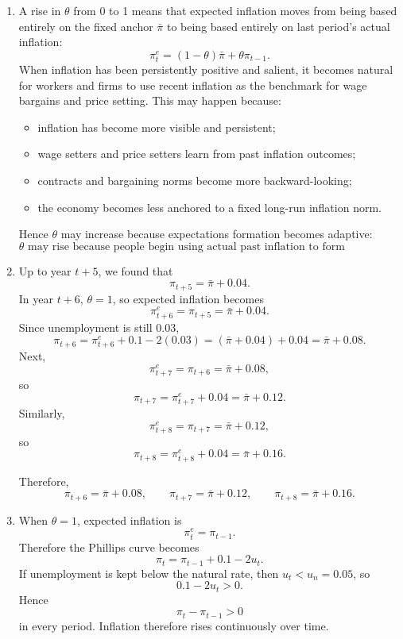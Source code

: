 \documentclass[12pt]{article}
\begin{document}
\begin{enumerate}[label=(\alph*)]
    \item
    A rise in \(\theta\) from 0 to 1 means that expected inflation moves from being based entirely on the fixed anchor \(\bar{\pi}\) to being based entirely on last period's actual inflation:
    \[
    \pi_t^e=(1-\theta)\bar{\pi}+\theta\pi_{t-1}.
    \]
    When inflation has been persistently positive and salient, it becomes natural for workers and firms to use recent inflation as the benchmark for wage bargains and price setting. This may happen because:
    \begin{itemize}[leftmargin=*]
        \item inflation has become more visible and persistent;
        \item wage setters and price setters learn from past inflation outcomes;
        \item contracts and bargaining norms become more backward-looking;
        \item the economy becomes less anchored to a fixed long-run inflation norm.
    \end{itemize}
    Hence \(\theta\) may increase because expectations formation becomes adaptive:
    \[
    \boxed{\theta \text{ may rise because people begin using actual past inflation to form expectations.}}
    \]

    \item
    Up to year \(t+5\), we found that
    \[
    \pi_{t+5}=\bar{\pi}+0.04.
    \]
    In year \(t+6\), \(\theta=1\), so expected inflation becomes
    \[
    \pi_{t+6}^e=\pi_{t+5}=\bar{\pi}+0.04.
    \]
    Since unemployment is still \(0.03\),
    \[
    \pi_{t+6}=\pi_{t+6}^e+0.1-2(0.03)
    =(\bar{\pi}+0.04)+0.04
    =\bar{\pi}+0.08.
    \]
    Next,
    \[
    \pi_{t+7}^e=\pi_{t+6}=\bar{\pi}+0.08,
    \]
    so
    \[
    \pi_{t+7}=\pi_{t+7}^e+0.04
    =\bar{\pi}+0.12.
    \]
    Similarly,
    \[
    \pi_{t+8}^e=\pi_{t+7}=\bar{\pi}+0.12,
    \]
    so
    \[
    \pi_{t+8}=\pi_{t+8}^e+0.04
    =\bar{\pi}+0.16.
    \]

    Therefore,
    \[
    \boxed{\pi_{t+6}=\bar{\pi}+0.08,\qquad \pi_{t+7}=\bar{\pi}+0.12,\qquad \pi_{t+8}=\bar{\pi}+0.16.}
    \]

    \item
    When \(\theta=1\), expected inflation is
    \[
    \pi_t^e=\pi_{t-1}.
    \]
    Therefore the Phillips curve becomes
    \[
    \pi_t=\pi_{t-1}+0.1-2u_t.
    \]
    If unemployment is kept below the natural rate, then \(u_t<u_n=0.05\), so
    \[
    0.1-2u_t>0.
    \]
    Hence
    \[
    \pi_t-\pi_{t-1}>0
    \]
    in every period. Inflation therefore rises continuously over time.


\end{enumerate}
\end{document}
